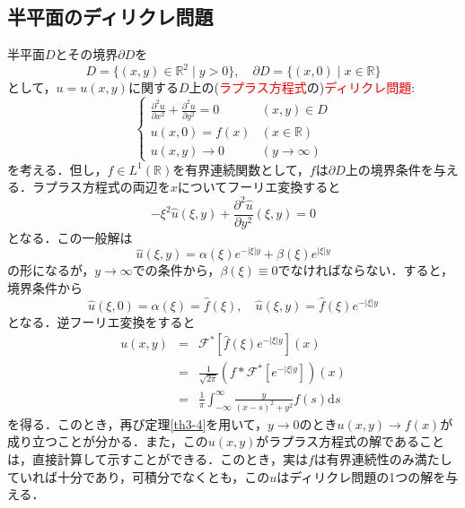 \documentclass[a4j]{jsbook}
\numberwithin{theorem}{chapter}  %
\begin{document}
\subsection{半平面のディリクレ問題} \label{subsec3-9-2}
半平面\(D\)とその境界\(\partial D\)を
\begin{equation*}
    D=\{(x, y)\in\mathbb{R}^2\mid y>0\},\quad\partial D=\{(x, 0)\mid x\in\mathbb{R}\}
\end{equation*}
として，\(u=u(x, y)\)に関する\(D\)上の(\textcolor{red}{ラプラス方程式}の)\textcolor{red}{ディリクレ問題}:
\begin{equation*}
    \begin{cases}
    \frac{\partial^2 u}{\partial x^2}+\frac{\partial^2 u}{\partial y^2}=0 & (x,y)\in D \\
    u(x, 0)=f(x) & (x\in\mathbb{R}) \\
    u(x, y)\to 0 & (y\to\infty)
    \end{cases}
\end{equation*}
を考える．但し，\(f\in L^1(\mathbb{R})\)を有界連続関数として，\(f\)は\(\partial D\)上の境界条件を与える．ラプラス方程式の両辺を\(x\)についてフーリエ変換すると
\begin{equation*}
    -\xi^2\hat{u}(\xi, y)+\frac{\partial^2\hat{u}}{\partial y^2}(\xi, y)=0
\end{equation*}
となる．この一般解は
\begin{equation*}
    \hat{u}(\xi, y)=\alpha(\xi)e^{-|\xi|y}+\beta(\xi)e^{|\xi|y}
\end{equation*}
の形になるが，\(y\to\infty\)での条件から，\(\beta(\xi)\equiv 0\)でなければならない．すると，境界条件から
\begin{equation*}
    \hat{u}(\xi, 0)=\alpha(\xi)=\hat{f}(\xi),\quad\hat{u}(\xi, y)=\hat{f}(\xi)e^{-|\xi|y}
\end{equation*}
となる．逆フーリエ変換をすると
\begin{eqnarray*}
u(x, y)&=&\mathcal{F}^*\left[\hat{f}(\xi)e^{-|\xi|y}\right](x) \\
&=&\frac{1}{\sqrt{2\pi}}\left(f*\mathcal{F}^*\left[e^{-|\xi|y}\right]\right)(x) \\
&=&\frac{1}{\pi}\int_{-\infty}^\infty\frac{y}{(x-s)^2+y^2}f(s)\mathrm{d}s
\end{eqnarray*}
を得る．このとき，再び定理\ref{th3-4}を用いて，\(y\to 0\)のとき\(u(x, y)\to f(x)\)が成り立つことが分かる．また，この\(u(x, y)\)がラプラス方程式の解であることは，直接計算して示すことができる．このとき，実は\(f\)は有界連続性のみ満たしていれば十分であり，可積分でなくとも，この\(u\)はディリクレ問題の1つの解を与える．
\end{document}
